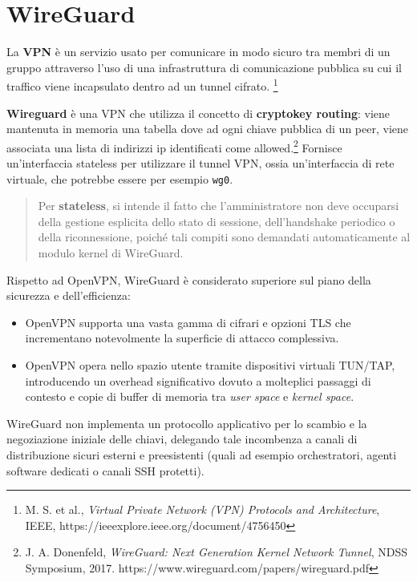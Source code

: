 \section{WireGuard}\label{wireguard}

La \textbf{VPN} è un servizio usato per comunicare in modo sicuro tra
membri di un gruppo attraverso l'uso di una infrastruttura di
comunicazione pubblica su cui il traffico viene incapsulato dentro ad un
tunnel cifrato. \footnote{\label{fn:ref_27}M. S. et al., \emph{Virtual Private Network
  (VPN) Protocols and Architecture}, IEEE,
  https://ieeexplore.ieee.org/document/4756450}

\textbf{Wireguard} è una VPN che utilizza il concetto di
\textbf{cryptokey routing}: viene mantenuta in memoria una tabella dove
ad ogni chiave pubblica di un peer, viene associata una lista di
indirizzi ip identificati come allowed.\footnote{\label{fn:ref_28}J. A. Donenfeld,
  \emph{WireGuard: Next Generation Kernel Network Tunnel}, NDSS
  Symposium, 2017. https://www.wireguard.com/papers/wireguard.pdf}
Fornisce un'interfaccia stateless per utilizzare il tunnel VPN, ossia
un'interfaccia di rete virtuale, che potrebbe essere per esempio
\passthrough{\lstinline!wg0!}.

\begin{quote}
Per \textbf{stateless}, si intende il fatto che l'amministratore non
deve occuparsi della gestione esplicita dello stato di sessione,
dell'handshake periodico o della riconnessione, poiché tali compiti sono
demandati automaticamente al modulo kernel di WireGuard.
\end{quote}

Rispetto ad OpenVPN, WireGuard è considerato superiore sul piano della
sicurezza e dell'efficienza:

\begin{itemize}
\tightlist
\item
  OpenVPN supporta una vasta gamma di cifrari e opzioni TLS che
  incrementano notevolmente la superficie di attacco complessiva.
\item
  OpenVPN opera nello spazio utente tramite dispositivi virtuali
  TUN/TAP, introducendo un overhead significativo dovuto a molteplici
  passaggi di contesto e copie di buffer di memoria tra \emph{user
  space} e \emph{kernel space}.
\end{itemize}

WireGuard non implementa un protocollo applicativo per lo scambio e la
negoziazione iniziale delle chiavi, delegando tale incombenza a canali
di distribuzione sicuri esterni e preesistenti (quali ad esempio
orchestratori, agenti software dedicati o canali SSH protetti).

